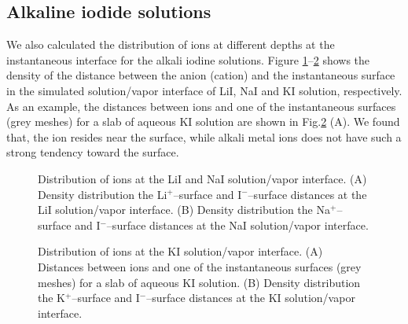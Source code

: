 \subsection{Alkaline iodide solutions}
We also calculated the distribution of ions at different depths at the instantaneous interface for the alkali iodine solutions.
Figure \ref{fig:prob_dist_Li_surf_I_surf}--\ref{fig:prob_dist_K_surf_I_surf} shows the density of the distance between the anion (cation) 
and the instantaneous surface in the simulated solution/vapor interface of LiI, NaI and KI solution, respectively. 
As an example, the distances between ions and one of the instantaneous surfaces (grey meshes) 
for a slab of aqueous KI solution are shown in Fig.\thinspace\ref{fig:prob_dist_K_surf_I_surf} (A). 
We found that, the \I ion resides near the surface, while alkali metal ions does not have such a strong tendency toward the surface. 
\begin{figure}[H]%
    \centering
    \qquad
    \caption{
Distribution of ions at the LiI and NaI solution/vapor interface.   
(A) 
Density distribution the Li$^+$--surface and I$^-$--surface distances at the LiI solution/vapor interface. 
(B)
Density distribution the Na$^+$--surface and I$^-$--surface distances at the NaI solution/vapor interface. 
}%
    \label{fig:prob_dist_Li_surf_I_surf}%
\end{figure}
\begin{figure}[H]%
    \centering
    \qquad
    \caption{
Distribution of ions at the KI solution/vapor interface.   
(A) 
Distances between ions and one of the instantaneous surfaces (grey meshes) for a slab of aqueous KI solution. 
(B)
Density distribution the K$^+$--surface and I$^-$--surface distances at the KI solution/vapor interface. 
}%
    \label{fig:prob_dist_K_surf_I_surf}%
\end{figure}

